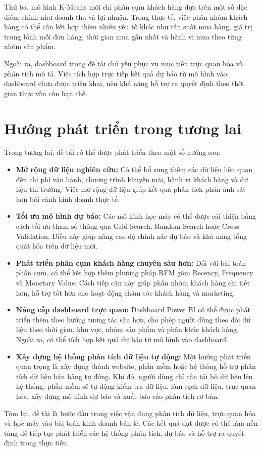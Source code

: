 Thứ ba, mô hình K-Means mới chỉ phân cụm khách hàng dựa trên một số đặc điểm chính như doanh thu và lợi nhuận. Trong thực tế, việc phân nhóm khách hàng có thể cần kết hợp thêm nhiều yếu tố khác như tần suất mua hàng, giá trị trung bình mỗi đơn hàng, thời gian mua gần nhất và hành vi mua theo từng nhóm sản phẩm.

Ngoài ra, dashboard trong đề tài chủ yếu phục vụ mục tiêu trực quan hóa và phân tích mô tả. Việc tích hợp trực tiếp kết quả dự báo từ mô hình vào dashboard chưa được triển khai, nên khả năng hỗ trợ ra quyết định theo thời gian thực vẫn còn hạn chế.

\section{Hướng phát triển trong tương lai}

Trong tương lai, đề tài có thể được phát triển theo một số hướng sau:

\begin{itemize}
	\item \textbf{Mở rộng dữ liệu nghiên cứu:} 
	Có thể bổ sung thêm các dữ liệu liên quan đến chi phí vận hành, chương trình khuyến mãi, hành vi khách hàng và dữ liệu thị trường. Việc mở rộng dữ liệu giúp kết quả phân tích phản ánh sát hơn bối cảnh kinh doanh thực tế.
	
	\item \textbf{Tối ưu mô hình dự báo:} 
	Các mô hình học máy có thể được cải thiện bằng cách tối ưu tham số thông qua Grid Search, Random Search hoặc Cross Validation. Điều này giúp nâng cao độ chính xác dự báo và khả năng tổng quát hóa trên dữ liệu mới.
	
	\item \textbf{Phát triển phân cụm khách hàng chuyên sâu hơn:} 
	Đối với bài toán phân cụm, có thể kết hợp thêm phương pháp RFM gồm Recency, Frequency và Monetary Value. Cách tiếp cận này giúp phân nhóm khách hàng chi tiết hơn, hỗ trợ tốt hơn cho hoạt động chăm sóc khách hàng và marketing.
	
	\item \textbf{Nâng cấp dashboard trực quan:} 
	Dashboard Power BI có thể được phát triển thêm theo hướng tương tác sâu hơn, cho phép người dùng theo dõi dữ liệu theo thời gian, khu vực, nhóm sản phẩm và phân khúc khách hàng. Ngoài ra, có thể tích hợp kết quả dự báo từ mô hình vào dashboard.
	
	\item \textbf{Xây dựng hệ thống phân tích dữ liệu tự động:} 
	Một hướng phát triển quan trọng là xây dựng thành website, phần mềm hoặc hệ thống hỗ trợ phân tích dữ liệu bán hàng tự động. Khi đó, người dùng chỉ cần tải bộ dữ liệu lên hệ thống, phần mềm sẽ tự động kiểm tra dữ liệu, làm sạch dữ liệu, trực quan hóa, xây dựng mô hình dự báo và xuất báo cáo phân tích cơ bản.
\end{itemize}

Tóm lại, đề tài là bước đầu trong việc vận dụng phân tích dữ liệu, trực quan hóa và học máy vào bài toán kinh doanh bán lẻ. Các kết quả đạt được có thể làm nền tảng để tiếp tục phát triển các hệ thống phân tích, dự báo và hỗ trợ ra quyết định trong thực tiễn.	